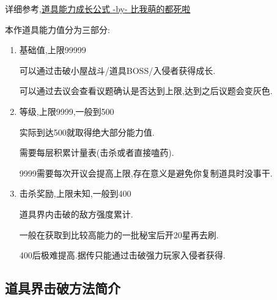	详细参考,\href{http://tieba.baidu.com/f?kz=3834692385}{道具能力成长公式 -by- 比我萌的都死啦}

	本作道具能力值分为三部分:

	\begin{enumerate}

		\item 
		基础值,上限99999

		可以通过击破小屋战斗/道具BOSS/入侵者获得成长.

		可以通过去议会查看议题确认是否达到上限,达到之后议题会变灰色.

		\item
		等级,上限9999,一般到500

		实际到达500就取得绝大部分能力值.

		需要每层积累计量表(击杀或者直接嗑药).

		9999需要每次开议会提高上限,存在意义是避免你复制道具时没事干.

		\item
		击杀奖励,上限未知,一般到400

		道具界内击破的敌方强度累计.

		一般在获取到比较高能力的一批秘宝后开20星再去刷.

		400后极难提高.据传只能通过击破强力玩家入侵者获得.

	\end{enumerate}
	

	\subsection{道具界击破方法简介}


